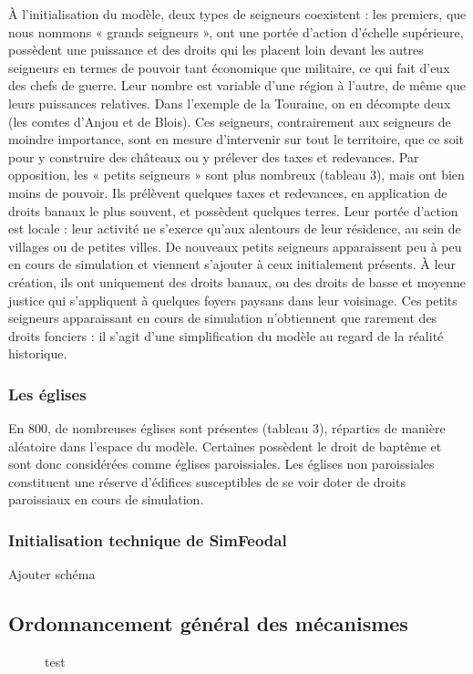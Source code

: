 {À l'initialisation du modèle, deux types de seigneurs coexistent : les premiers, que nous nommons « grands seigneurs », ont une portée d'action d'échelle supérieure, possèdent une puissance et des droits qui les placent loin devant les autres seigneurs en termes de pouvoir tant économique que militaire, ce qui fait d'eux des chefs de guerre.
Leur nombre est variable d'une région à l'autre, de même que leurs puissances relatives.
Dans l'exemple de la Touraine, on en décompte deux (les comtes d'Anjou et de Blois).
Ces seigneurs, contrairement aux seigneurs de moindre importance, sont en mesure d'intervenir sur tout le territoire, que ce soit pour y construire des châteaux ou y prélever des taxes et redevances.
Par opposition, les « petits seigneurs » sont plus nombreux (tableau 3), mais ont bien moins de pouvoir.
Ils prélèvent quelques taxes et redevances, en application de droits banaux le plus souvent, et possèdent quelques terres.
Leur portée d'action est locale : leur activité ne s'exerce qu'aux alentours de leur résidence, au sein de villages ou de petites villes.
De nouveaux petits seigneurs apparaissent peu à peu en cours de simulation et viennent s'ajouter à ceux initialement présents.
À leur création, ils ont uniquement des droits banaux, ou des droits de basse et moyenne justice qui s'appliquent à quelques foyers paysans dans leur voisinage.
Ces petits seigneurs apparaissant en cours de simulation n'obtiennent que rarement des droits fonciers : il s'agit d'une simplification du modèle au regard de la réalité historique.

\subsubsection{Les églises}

En 800, de nombreuses églises sont présentes (tableau 3), réparties de manière aléatoire dans l'espace du modèle. 
Certaines possèdent le droit de baptême et sont donc considérées comme églises paroissiales.
Les églises non paroissiales constituent une réserve d'édifices susceptibles de se voir doter de droits paroissiaux en cours de simulation.

\subsubsection{Initialisation technique de SimFeodal}

Ajouter schéma

\subsection{Ordonnancement général des mécanismes}
{\blueroman
\begin{figure}[H]
	
	\caption{test}
\end{figure}

}}
